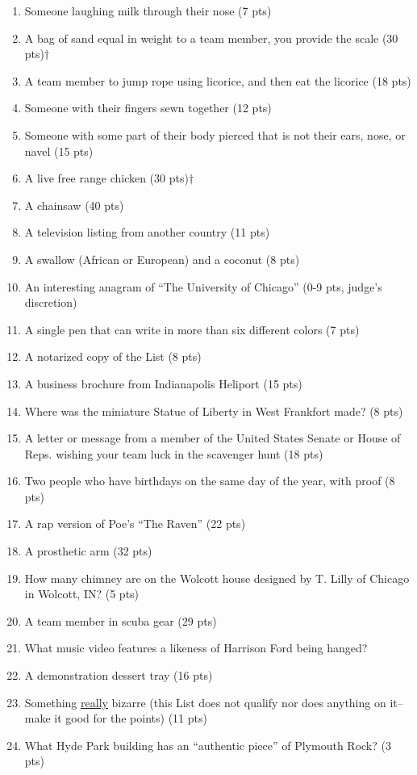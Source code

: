 \begin{enumerate}
\item Someone laughing milk through their nose (7 pts)
\item A bag of sand equal in weight to a team member, you provide the scale (30 pts)$\dagger$
\item A team member to jump rope using licorice, and then eat the licorice (18 pts)
\item Someone with their fingers sewn together (12 pts)
\item Someone with some part of their body pierced that is not their ears,  nose, or navel (15 pts)
\item A live free range chicken (30 pts)$\dagger$
\item A chainsaw (40 pts)
\item A television listing from another country (11 pts)
\item A swallow (African or European) and a coconut (8 pts)
\item An interesting anagram of ``The University of Chicago'' (0-9 pts, judge's discretion)
\item A single pen that can write in more than six different colors (7 pts)
\item A notarized copy of the List (8 pts)
\item A business brochure from Indianapolis Heliport (15 pts)
\item Where was the miniature Statue of Liberty in West Frankfort made? (8 pts)
\item A letter or message from a member of the United States Senate or House of Reps. wishing your team luck in the scavenger hunt (18 pts)
\item Two people who have birthdays on the same day of the year, with proof (8 pts)
\item A rap version of Poe's ``The Raven'' (22 pts)
\item A prosthetic arm (32 pts)
\item How many chimney are on the Wolcott house designed by T. Lilly of Chicago in Wolcott, IN? (5 pts)
\item A team member in scuba gear (29 pts)
\item What music video features a likeness of Harrison Ford being hanged?
\item A demonstration dessert tray (16 pts)
\item Something \underline{really} bizarre (this List does not qualify nor does anything on it--make it good for the points) (11 pts)
\item What Hyde Park building has an ``authentic piece'' of Plymouth Rock? (3 pts)

\end{enumerate}
